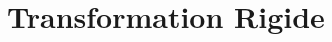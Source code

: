 \documentclass[../CSC_5RO17_TA_TP4.tex]{subfiles}
\begin{document}
\section{Transformation Rigide}
\end{document}
